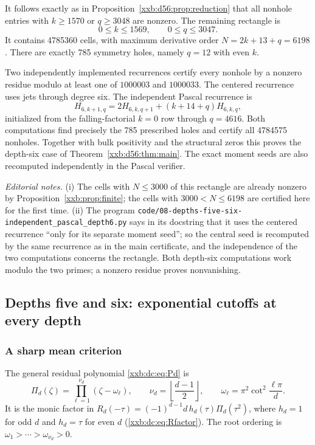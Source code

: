 \documentclass[11pt,a4paper]{article}
\numberwithin{equation}{section}
\theoremstyle{definition}
\theoremstyle{remark}
\theoremstyle{plain}
\begin{document}
It follows exactly as in Proposition~\ref{xxb:d56:prop:reduction} that all
nonhole entries with $k\ge1570$ or $q\ge3048$ are nonzero. The remaining
rectangle is
\[
 0\le k\le1569,\qquad0\le q\le3047.
\]
It contains 4785360 cells, with maximum derivative order $N=2k+13+q=6198$.
There are exactly 785 symmetry holes, namely $q=12$ with even $k$.

Two independently implemented recurrences certify every nonhole by a nonzero
residue modulo at least one of $1000003$ and $1000033$. The centered recurrence
uses jets through degree six. The independent Pascal recurrence is
\[
 H_{6,k+1,q}=2H_{6,k,q+1}+(k+14+q)H_{6,k,q},
\]
initialized from the falling-factorial $k=0$ row through $q=4616$. Both
computations find precisely the 785 prescribed holes and certify all 4784575
nonholes. Together with bulk positivity and the structural zeros this proves
the depth-six case of Theorem~\ref{xxb:d56:thm:main}. The exact moment seeds
are also recomputed independently in the Pascal verifier.

\emph{Editorial notes.}  (i) The cells with $N\le3000$ of this rectangle are
already nonzero by Proposition~\ref{xxb:prop:finite}; the cells with
$3000<N\le6198$ are certified here for the first time.  (ii) The program
\texttt{code/08-depths-\allowbreak five-\allowbreak six-\allowbreak independent\_pascal\_depth6.py}
says in its docstring that it uses the centered recurrence ``only for its
separate moment seed''; so the central seed is recomputed by the same
recurrence as in the main certificate, and the independence of the two
computations concerns the rectangle.  Both depth-six computations work modulo
the two primes; a nonzero residue proves nonvanishing.

\subsection{Depths five and six: exponential cutoffs at every depth}\label{xxb:d56:sec:general}

\subsubsection{A sharp mean criterion}

The general residual polynomial \eqref{xxb:dc:eq:Pd} is
\[
 \Pi_d(\zeta)=\prod_{\ell=1}^{\nu_d}(\zeta-\omega_\ell),\qquad
 \nu_d=\left\lfloor\frac{d-1}{2}\right\rfloor,\qquad
 \omega_\ell=\pi^2\cot^2\frac{\ell\pi}{d}.
\]
It is the monic factor in
$R_d(-\tau)=(-1)^{d-1}d\,h_d(\tau)\Pi_d(\tau^2)$, where $h_d=1$ for odd $d$ and
$h_d=\tau$ for even $d$ (\eqref{xxb:dc:eq:Rfactor}). The root ordering is
$\omega_1>\cdots>\omega_{\nu_d}>0$.
\end{document}
